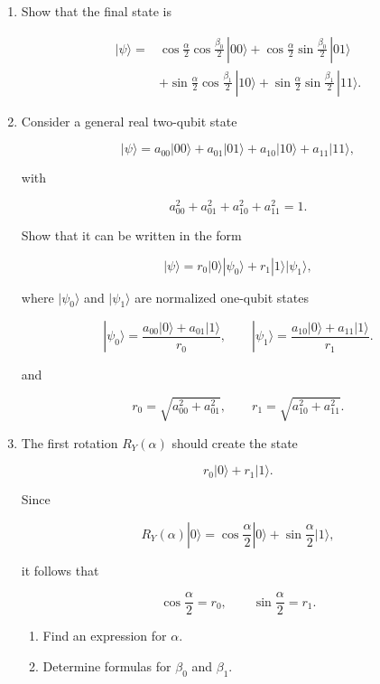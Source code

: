 \documentclass[11pt]{article}
\begin{document}
\begin{enumerate}[label=\textbf{Exercise \arabic*.}, leftmargin=2.2cm]
\begin{enumerate}[label=(\alph*)]

\item Show that the final state is

\[
\begin{aligned}
|\psi\rangle
=&
\cos\frac{\alpha}{2}\cos\frac{\beta_0}{2}\,|00\rangle
+
\cos\frac{\alpha}{2}\sin\frac{\beta_0}{2}\,|01\rangle \\
&
+\sin\frac{\alpha}{2}\cos\frac{\beta_1}{2}\,|10\rangle
+
\sin\frac{\alpha}{2}\sin\frac{\beta_1}{2}\,|11\rangle .
\end{aligned}
\]

\item Consider a general real two-qubit state

\[
|\psi\rangle
=
a_{00}|00\rangle
+a_{01}|01\rangle
+a_{10}|10\rangle
+a_{11}|11\rangle ,
\]

with

\[
a_{00}^2+a_{01}^2+a_{10}^2+a_{11}^2=1.
\]

Show that it can be written in the form

\[
|\psi\rangle
=
r_0 |0\rangle |\psi_0\rangle
+
r_1 |1\rangle |\psi_1\rangle ,
\]

where $|\psi_0\rangle$ and $|\psi_1\rangle$ are normalized
one-qubit states

\[
|\psi_0\rangle
=
\frac{a_{00}|0\rangle+a_{01}|1\rangle}{r_0},
\qquad
|\psi_1\rangle
=
\frac{a_{10}|0\rangle+a_{11}|1\rangle}{r_1}.
\]

and

\[
r_0=\sqrt{a_{00}^2+a_{01}^2},
\qquad
r_1=\sqrt{a_{10}^2+a_{11}^2}.
\]

\item The first rotation $R_Y(\alpha)$ should create the state

\[
r_0|0\rangle+r_1|1\rangle .
\]

Since

\[
R_Y(\alpha)|0\rangle
=
\cos\frac{\alpha}{2}|0\rangle
+
\sin\frac{\alpha}{2}|1\rangle ,
\]

it follows that

\[
\cos\frac{\alpha}{2}=r_0,
\qquad
\sin\frac{\alpha}{2}=r_1.
\]

\begin{enumerate}[label=(\roman*)]

\item Find an expression for $\alpha$.

\item Determine formulas for $\beta_0$ and $\beta_1$.


\end{enumerate}
\end{enumerate}
\end{enumerate}
\end{document}
